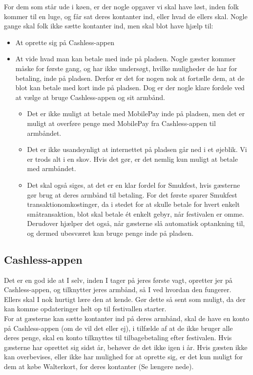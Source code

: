 For dem som står ude i køen, er der nogle opgaver vi skal have løst, inden folk kommer til 
en luge, og får sat deres kontanter ind, eller hvad de ellers skal.
Nogle gange skal folk ikke sætte kontanter ind, men skal blot have hjælp til:
\begin{itemize}
  \item At oprette sig på Cashless-appen
  \item At vide hvad man kan betale med inde på pladsen. Nogle gæster kommer måske for første gang, 
  og har ikke undersøgt, hvilke muligheder de har for betaling, inde på pladsen.
  Derfor er det for nogen nok at fortælle dem, at de blot kan betale med kort inde på pladsen.
  Dog er der nogle klare fordele ved at vælge at bruge Cashless-appen og sit armbånd.
  \begin{itemize}
    \item Det er ikke muligt at betale med MobilePay inde på pladsen, men det er muligt at 
    overføre penge med MobilePay fra Cashless-appen til armbåndet.
    \item Det er ikke usandsynligt at internettet på pladsen går ned i et øjeblik. Vi er 
    trods alt i en skov. Hvis det gør, er det nemlig kun muligt at betale med armbåndet.
    \item Det skal også siges, at det er en klar fordel for Smukfest, hvis gæsterne gør brug at 
    deres armbånd til betaling. For det første sparer Smukfest transaktionomkostinger, da i stedet for 
    at skulle betale for hvert enkelt småtransaktion, blot skal betale ét enkelt gebyr, når festivalen er omme. 
    Derudover hjælper det også, når gæsterne slå automatisk optankning til, og dermed ubesværet
    kan bruge penge inde på pladsen.
  \end{itemize}
\end{itemize}

\subsection{Cashless-appen}

Det er en god ide at I selv, inden I tager på jeres første vagt, opretter jer på
Cashless-appen, og tilknytter jeres armbånd, så I ved hvordan den fungerer. 
Ellers skal I nok hurtigt lære den at kende.
Gør dette så sent som muligt, da der kan komme opdateringer helt op til festivallen starter. \\

For at gæsterne kan sætte kontanter ind på deres armbånd, skal de have en konto på 
Cashless-appen (om de vil det eller ej), 
i tilfælde af at de ikke bruger alle deres penge, skal en konto tilknyttes til tilbagebetaling efter
festivalen. Hvis gæsterne har oprettet sig sidst år, behøver de det ikke igen i år.
Hvis gæsten ikke kan overbevises, eller ikke har mulighed for at oprette sig, er det kun muligt 
for dem at købe Walterkort, for deres kontanter (Se længere nede).

